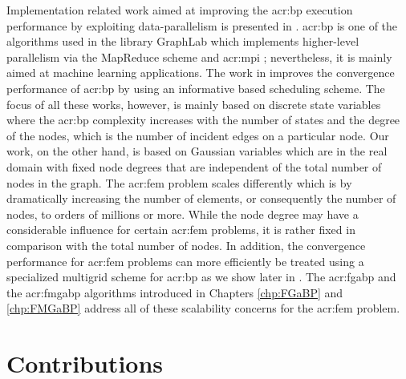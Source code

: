 Implementation related work aimed at improving the \gls{acr:bp} execution performance by exploiting data-parallelism is presented in \cite{bib:ma2011data,bib:xia2010scalable,bib:Gonzalez2009DPI,bib:Hsieh2012PBP}.
\Gls{acr:bp} is one of the algorithms used in the library GraphLab \cite{bib:graphlab2010} which implements higher-level parallelism via the MapReduce scheme \cite{bib:dean2008mapreduce} and \gls{acr:mpi} \cite{bib:mpiForum}; nevertheless, it is mainly aimed at machine learning applications.
The work in \cite{bib:Elidan06ResidualBP,bib:gonzalez2009residual} improves the convergence performance of \gls{acr:bp} by using an informative based scheduling scheme.
The focus of all these works, however, is mainly based on discrete state variables where the \gls{acr:bp} complexity increases with the number of states and the degree of the nodes, which is the number of incident edges on a particular node.
Our work, on the other hand, is based on Gaussian variables which are in the real domain with fixed node degrees that are independent of the total number of nodes in the graph.
The \gls{acr:fem} problem scales differently which is by dramatically increasing the number of elements, or consequently the number of nodes, to orders of millions or more.
While the node degree may have a considerable influence for certain \gls{acr:fem} problems, it is rather fixed in comparison with the total number of nodes.
In addition, the convergence performance for \gls{acr:fem} problems can more efficiently be treated using a specialized multigrid scheme for \gls{acr:bp} as we show later in .
The \gls{acr:fgabp} and the \gls{acr:fmgabp} algorithms introduced in Chapters \ref{chp:FGaBP} and \ref{chp:FMGaBP} address all of these scalability concerns for the \gls{acr:fem} problem.


\section{Contributions}
\label{sec:cont}

